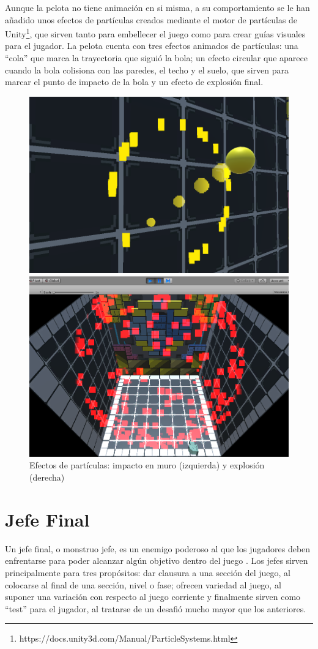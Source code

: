Aunque la pelota no tiene animación en si misma, a su comportamiento se le han añadido unos efectos de partículas creados mediante el motor de partículas de Unity\footnote{https://docs.unity3d.com/Manual/ParticleSystems.html}, que sirven tanto para embellecer el juego como para crear guías visuales para el jugador. La pelota cuenta con tres efectos animados de partículas: una ``cola'' que marca la trayectoria que siguió la bola; un efecto circular que aparece cuando la bola colisiona con las paredes, el techo y el suelo, que sirven para marcar el punto de impacto de la bola y un efecto de explosión final.
\begin{figure}[!htb]
   \begin{minipage}{0.48\textwidth}
     \centering
     \includegraphics[width=0.7\linewidth, right]{images/estructura/fisica/ball_hit}
   \end{minipage}\hfill
   \begin {minipage}{0.48\textwidth}
     \centering
     \includegraphics[width=0.7\linewidth, left]{images/estructura/fisica/ball_explosion}
   \end{minipage}
   \caption{Efectos de partículas: impacto en muro (izquierda) y explosión (derecha)}
\end{figure}

\section{Jefe Final}
Un jefe final, o monstruo jefe, es un enemigo poderoso al que los jugadores deben enfrentarse para poder alcanzar algún objetivo dentro del juego \cite{game_design_patterns}. Los jefes sirven principalmente para tres propósitos: dar clausura a una sección del juego, al colocarse al final de una sección, nivel o fase; ofrecen variedad al juego, al suponer una variación con respecto al juego corriente y finalmente sirven como ``test'' para el jugador, al tratarse de un desafió mucho mayor que los anteriores. 

